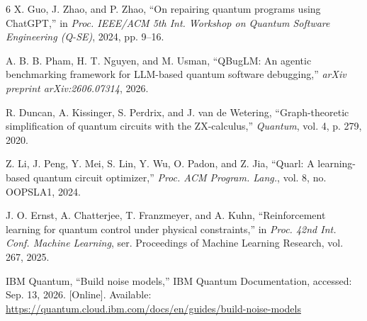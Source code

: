 \documentclass[conference]{IEEEtran}
\begin{document}
\begin{thebibliography}{6}
X. Guo, J. Zhao, and P. Zhao, ``On repairing quantum programs using ChatGPT,''
in \emph{Proc. IEEE/ACM 5th Int. Workshop on Quantum Software Engineering (Q-SE)},
2024, pp. 9--16.

A. B. B. Pham, H. T. Nguyen, and M. Usman, ``QBugLM: An agentic benchmarking
framework for LLM-based quantum software debugging,''
\emph{arXiv preprint arXiv:2606.07314}, 2026.

R. Duncan, A. Kissinger, S. Perdrix, and J. van de Wetering,
``Graph-theoretic simplification of quantum circuits with the ZX-calculus,''
\emph{Quantum}, vol. 4, p. 279, 2020.

Z. Li, J. Peng, Y. Mei, S. Lin, Y. Wu, O. Padon, and Z. Jia,
``Quarl: A learning-based quantum circuit optimizer,''
\emph{Proc. ACM Program. Lang.}, vol. 8, no. OOPSLA1, 2024.

J. O. Ernst, A. Chatterjee, T. Franzmeyer, and A. Kuhn,
``Reinforcement learning for quantum control under physical constraints,''
in \emph{Proc. 42nd Int. Conf. Machine Learning},
ser. Proceedings of Machine Learning Research, vol. 267, 2025.

IBM Quantum, ``Build noise models,'' IBM Quantum Documentation,
accessed: Sep. 13, 2026. [Online]. Available:
\url{https://quantum.cloud.ibm.com/docs/en/guides/build-noise-models}
\end{thebibliography}
\end{document}
